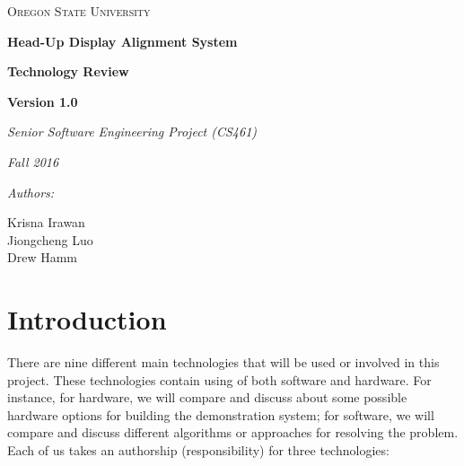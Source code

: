 \documentclass[letterpaper,10pt,onecolumn]{IEEEtran}
\def\name{Krisna Irawan\\ Jiongcheng Luo\\ Drew Hamm}
\def\doc{Technology Review}
\def\version{Version 1.0}
\begin{document}
\begin{titlepage}
	\centering
	{\scshape\LARGE Oregon State University\par}
	\vspace{2cm}
	{\huge\bfseries Head-Up Display Alignment System\par}
	\vspace{1cm}
	{\Large\bfseries \doc\par}
	\vspace{1cm}
	{\Large\bfseries \version\par}
	\vspace{1cm}
	{\Large\itshape Senior Software Engineering Project (CS461)\par}
	{\Large\itshape Fall 2016\par}
	\vspace{1cm}
	{\normalsize\itshape Authors:\par}
	{\normalsize \name\par}
	\vspace{1cm}
	\vspace{3cm}


	\begin{abstract}
		This project is a proof concept to explore a potential technological innovation for Head-Up Display (HUD) system that present critical flight information to pilots. The primary objective of this project is to reduce the cost and time required to precisely align flight information to the HUD by introducing additional sensor to the system to make the alignment process more dynamic. To achieve this goal, there are nine different main technologies that will be critical for the development of the project. This document will compare three alternative options for each main technologies. This document will also include the option that we choose for each main technologies to develop this project. 

	\end{abstract}
\end{titlepage}
\tableofcontents

\newpage
\section{Introduction}
There are nine different main technologies that will be used or involved in this project. These technologies contain using of both software and hardware. For instance, for hardware, we will compare and discuss about some possible hardware options for building the demonstration system; for software, we will compare and discuss different algorithms or approaches for resolving the problem. Each of us takes an authorship (responsibility) for three technologies:\\
\end{document}
